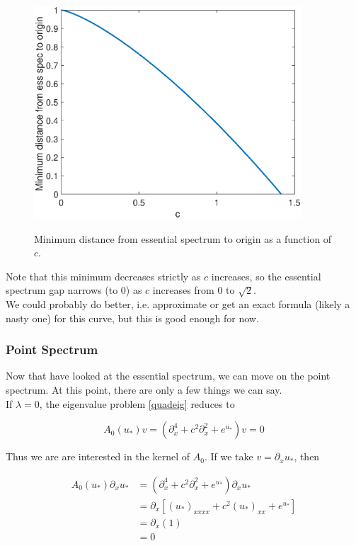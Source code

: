 \documentclass[12pt]{article}
\begin{document}
\begin{figure}[H]
\centering
\includegraphics[width=10cm]{minlambdaplus.eps}
\label{fig:essspec2}
\caption{Minimum distance from essential spectrum to origin as a function of $c$.}
\end{figure}

Note that this minimum decreases strictly as $c$ increases, so the essential spectrum gap narrows (to 0) as $c$ increases from 0 to $\sqrt{2}$.\\

We could probably do better, i.e. approximate or get an exact formula (likely a nasty one) for this curve, but this is good enough for now.

\subsubsection{Point Spectrum}

Now that have looked at the essential spectrum, we can move on the point spectrum. At this point, there are only a few things we can say.\\

If $\lambda = 0$, the eigenvalue problem \eqref{quadeig} reduces to

\begin{equation*}
A_0(u_*) v = (\partial_x^4 + c^2 \partial_x^2 + e^{u_*})v = 0
\end{equation*}

Thus we are are interested in the kernel of $A_0$. If we take $v = \partial_x u_*$, then

\begin{align*}
A_0(u_*) \partial_x u_* &= 
(\partial_x^4 + c^2 \partial_x^2 + e^{u_*})\partial_x u_* \\
&= \partial_x[(u_*)_{xxxx} + c^2 (u_*)_{xx} + e^{u_*}] \\
&= \partial_x(1) \\
&= 0
\end{align*}
\end{document}
